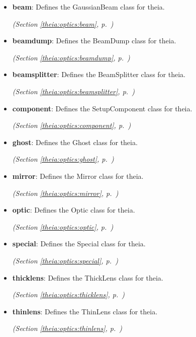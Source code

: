 \begin{itemize}
\setlength{\parskip}{0ex}
\item \textbf{beam}: Defines the GaussianBeam class for theia.



  \textit{(Section \ref{theia:optics:beam}, p.~\pageref{theia:optics:beam})}

\item \textbf{beamdump}: Defines the BeamDump class for theia.



  \textit{(Section \ref{theia:optics:beamdump}, p.~\pageref{theia:optics:beamdump})}

\item \textbf{beamsplitter}: Defines the BeamSplitter class for theia.



  \textit{(Section \ref{theia:optics:beamsplitter}, p.~\pageref{theia:optics:beamsplitter})}

\item \textbf{component}: Defines the SetupComponent class for theia.



  \textit{(Section \ref{theia:optics:component}, p.~\pageref{theia:optics:component})}

\item \textbf{ghost}: Defines the Ghost class for theia.



  \textit{(Section \ref{theia:optics:ghost}, p.~\pageref{theia:optics:ghost})}

\item \textbf{mirror}: Defines the Mirror class for theia.



  \textit{(Section \ref{theia:optics:mirror}, p.~\pageref{theia:optics:mirror})}

\item \textbf{optic}: Defines the Optic class for theia.



  \textit{(Section \ref{theia:optics:optic}, p.~\pageref{theia:optics:optic})}

\item \textbf{special}: Defines the Special class for theia.



  \textit{(Section \ref{theia:optics:special}, p.~\pageref{theia:optics:special})}

\item \textbf{thicklens}: Defines the ThickLens class for theia.



  \textit{(Section \ref{theia:optics:thicklens}, p.~\pageref{theia:optics:thicklens})}

\item \textbf{thinlens}: Defines the ThinLens class for theia.



  \textit{(Section \ref{theia:optics:thinlens}, p.~\pageref{theia:optics:thinlens})}

\end{itemize}

